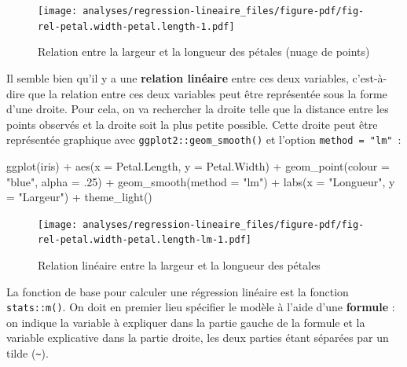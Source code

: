 \documentclass[
  letterpaper,
  DIV=11,
  numbers=noendperiod,
  oneside]{scrreprt}
\newenvironment{Shaded}{\begin{snugshade}}{\end{snugshade}}
\newcommand{\AttributeTok}[1]{\textcolor[rgb]{0.40,0.45,0.13}{#1}}
\newcommand{\DecValTok}[1]{\textcolor[rgb]{0.68,0.00,0.00}{#1}}
\newcommand{\FunctionTok}[1]{\textcolor[rgb]{0.28,0.35,0.67}{#1}}
\newcommand{\NormalTok}[1]{\textcolor[rgb]{0.00,0.23,0.31}{#1}}
\newcommand{\SpecialCharTok}[1]{\textcolor[rgb]{0.37,0.37,0.37}{#1}}
\newcommand{\StringTok}[1]{\textcolor[rgb]{0.13,0.47,0.30}{#1}}
\begin{document}
\begin{figure}[H]

{\centering \texttt{[image: analyses/regression-lineaire\_files/figure-pdf/fig-rel-petal.width-petal.length-1.pdf]}

}

\caption{\label{fig-rel-petal.width-petal.length}Relation entre la
largeur et la longueur des pétales (nuage de points)}

\end{figure}

Il semble bien qu'il y a une \textbf{relation linéaire} entre ces deux
variables, c'est-à-dire que la relation entre ces deux variables peut
être représentée sous la forme d'une droite. Pour cela, on va rechercher
la droite telle que la distance entre les points observés et la droite
soit la plus petite possible. Cette droite peut être représentée
graphique avec \texttt{ggplot2::geom\_smooth()} et l'option
\texttt{method\ =\ "lm"}~:

\begin{Shaded}
\begin{Highlighting}[]
\FunctionTok{ggplot}\NormalTok{(iris) }\SpecialCharTok{+}
  \FunctionTok{aes}\NormalTok{(}\AttributeTok{x =}\NormalTok{ Petal.Length, }\AttributeTok{y =}\NormalTok{ Petal.Width) }\SpecialCharTok{+}
  \FunctionTok{geom\_point}\NormalTok{(}\AttributeTok{colour =} \StringTok{"blue"}\NormalTok{, }\AttributeTok{alpha =}\NormalTok{ .}\DecValTok{25}\NormalTok{) }\SpecialCharTok{+}
  \FunctionTok{geom\_smooth}\NormalTok{(}\AttributeTok{method =} \StringTok{"lm"}\NormalTok{) }\SpecialCharTok{+}
  \FunctionTok{labs}\NormalTok{(}\AttributeTok{x =} \StringTok{"Longueur"}\NormalTok{, }\AttributeTok{y =} \StringTok{"Largeur"}\NormalTok{) }\SpecialCharTok{+}
  \FunctionTok{theme\_light}\NormalTok{()}
\end{Highlighting}
\end{Shaded}

\begin{figure}[H]

{\centering \texttt{[image: analyses/regression-lineaire\_files/figure-pdf/fig-rel-petal.width-petal.length-lm-1.pdf]}

}

\caption{\label{fig-rel-petal.width-petal.length-lm}Relation linéaire
entre la largeur et la longueur des pétales}

\end{figure}

La fonction de base pour calculer une régression linéaire est la
fonction \texttt{stats::m()}. On doit en premier lieu spécifier le
modèle à l'aide d'une \textbf{formule} : on indique la variable à
expliquer dans la partie gauche de la formule et la variable explicative
dans la partie droite, les deux parties étant séparées par un
tilde
(\texttt{\textasciitilde{}}).
\end{document}
